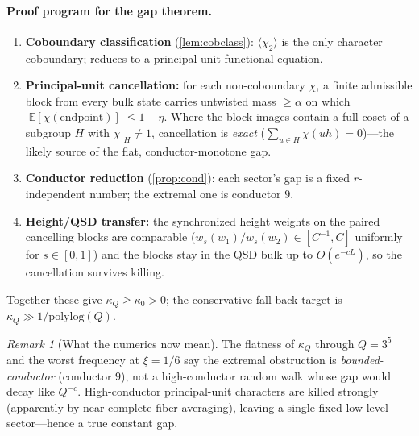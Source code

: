 \documentclass[11pt]{article}
\newcommand{\E}{\mathbb{E}}
\theoremstyle{plain}
\theoremstyle{remark}
\newtheorem*{remark}{Remark}
\begin{document}
\paragraph{Proof program for the gap theorem.}
\begin{enumerate}[leftmargin=1.6em,itemsep=1pt]
\item \textbf{Coboundary classification} (\cref{lem:cobclass}): $\langle\chi_2\rangle$
is the only character coboundary; reduces to a principal-unit functional equation.
\item \textbf{Principal-unit cancellation:} for each non-coboundary $\chi$, a
finite admissible block from every bulk state carries untwisted mass $\ge\alpha$
on which $\lvert\E[\chi(\text{endpoint})]\rvert\le 1-\eta$. Where the block images
contain a full coset of a subgroup $H$ with $\chi|_H\ne1$, cancellation is
\emph{exact} ($\sum_{u\in H}\chi(uh)=0$)---the likely source of the flat,
conductor-monotone gap.
\item \textbf{Conductor reduction} (\cref{prop:cond}): each sector's gap is a fixed
$r$-independent number; the extremal one is conductor $9$.
\item \textbf{Height/QSD transfer:} the synchronized height weights on the paired
cancelling blocks are comparable ($w_s(w_1)/w_s(w_2)\in[C^{-1},C]$ uniformly for
$s\in[0,1]$) and the blocks stay in the QSD bulk up to $O(e^{-cL})$, so the
cancellation survives killing.
\end{enumerate}
Together these give $\kappa_Q\ge\kappa_0>0$; the conservative fall-back target is
$\kappa_Q\gg1/\mathrm{polylog}(Q)$.

\begin{remark}[What the numerics now mean]
The flatness of $\kappa_Q$ through $Q=3^5$ and the worst frequency at $\xi=1/6$
say the extremal obstruction is \emph{bounded-conductor} (conductor $9$), not a
high-conductor random walk whose gap would decay like $Q^{-c}$. High-conductor
principal-unit characters are killed strongly (apparently by near-complete-fiber
averaging), leaving a single fixed low-level sector---hence a true constant gap.
\end{remark}
\end{document}
